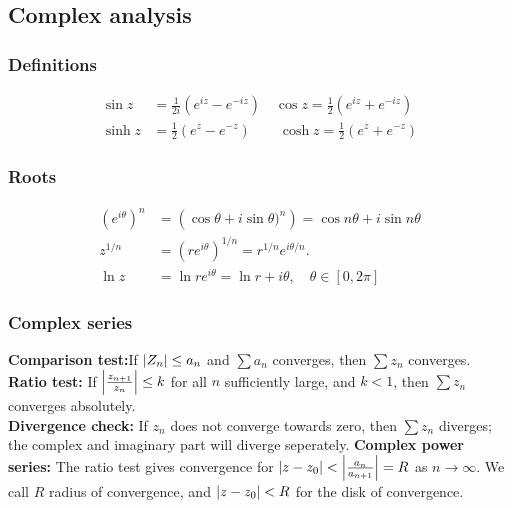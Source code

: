 \documentclass[a4paper, 10pt]{article}
\begin{document}
\tiny
\begin{multicols*}{3}
\begin{mdframed}
\subsection*{Complex analysis}
\end{mdframed}
\subsubsection*{Definitions}
\begin{align*}
  \sin{z} &= \frac{1}{2i}\left(e^{iz}-e^{-iz}\right)\quad
  \cos{z} = \frac{1}{2}\left(e^{iz}+e^{-iz}\right)\\
  \sinh{z} &= \frac{1}{2}\left(e^{z}-e^{-z}\right)\qquad
  \cosh{z} = \frac{1}{2}\left(e^{z}+e^{-z}\right)
\end{align*}

\subsubsection*{Roots}
\begin{align*}
  \left(e^{i\theta}\right)^n &= \left(\cos{\theta} + i \sin{\theta})^n\right) = \cos{n\theta} + i\sin{n\theta}\\
  z^{1/n} &= \left(re^{i\theta}\right)^{1/n} = r^{1/n}e^{i\theta/n}.\\
  \ln{z} &= \ln{re^{i\theta}} = \ln{r} + i\theta, \quad \theta \in [0, 2\pi]
\end{align*}


\subsubsection*{Complex series}
\textbf{Comparison test:}If $\abs{Z_n} \leq a_n$ and $\sum a_n$ converges, then $\sum z_n$ converges.\\
\textbf{Ratio test:} If $\abs{\frac{z_{n+1}}{z_n}} \leq k$ for all $n$ sufficiently large, and $k<1$, then $\sum z_n$ converges absolutely.\\
\textbf{Divergence check:} If $z_n$ does not converge towards zero, then $\sum z_n$ diverges; the complex and imaginary part will diverge seperately.
\textbf{Complex power series:} The ratio test gives convergence for $\abs{z-z_0} < \abs{\frac{a_n}{a_{n+1}}} = R$ as $n\rightarrow \infty$. We call $R$ radius of convergence, and $\abs{z-z_0} < R$ for the disk of convergence.


\end{multicols*}
\end{document}
